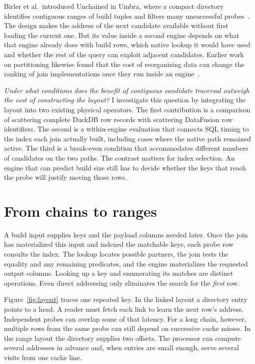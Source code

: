 \documentclass[11pt,a4paper]{article}
\begin{document}
Birler et al.\ introduced Unchained in Umbra, where a compact directory identifies contiguous
ranges of build tuples and filters many unsuccessful probes~\cite{birler}. The design makes the
address of the next candidate available without first loading the current one. But its value
inside a second engine depends on what that engine already does with build rows, which native
lookup it would have used and whether the rest of the query can exploit adjacent candidates.
Earlier work on partitioning likewise found that the cost of reorganizing data can change the
ranking of join implementations once they run inside an engine~\cite{bandle}.

\emph{Under what conditions does the benefit of contiguous candidate traversal outweigh the cost
of constructing the layout?} I investigate this question by integrating the layout into two
existing physical operators. The first contribution is a comparison of scattering complete DuckDB
row records with scattering DataFusion row identifiers. The second is a within-engine evaluation
that connects SQL timing to the index each join actually built, including cases where the native
path remained active. The third is a break-even condition that accommodates different numbers of
candidates on the two paths. The contrast matters for index selection. An engine that can predict
build size still has to decide whether the keys that reach the probe will justify moving those
rows.

\section{From chains to ranges}
\begingroup{}
A build input supplies keys and the payload columns needed later. Once the join has materialized
this input and indexed the matchable keys, each probe row consults the index. The lookup locates
possible partners, the join tests the equality and any remaining predicates, and the engine
materializes the requested output columns. Looking up a key and enumerating its matches are
distinct operations. Even direct addressing only eliminates the search for the \emph{first}
row.\par\endgroup

Figure~\ref{fig:layout} traces one repeated key. In the linked layout a directory entry points to
a head. A reader must fetch each link to learn the next row's address. Independent probes can
overlap some of that latency. For a long chain, however, multiple rows from the same probe can
still depend on successive cache misses. In the range layout the directory supplies two offsets.
The processor can compute several addresses in advance and, when entries are small enough, serve
several visits from one cache line.
\end{document}
